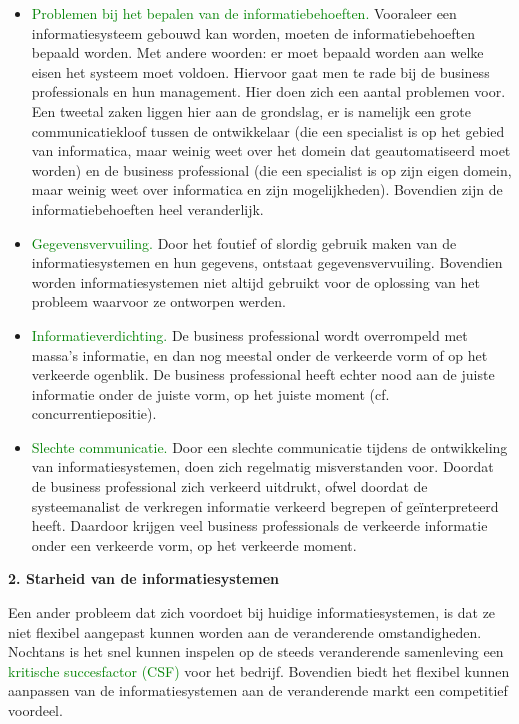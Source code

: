 \begin{itemize}
    \item \textcolor{green}{Problemen bij het bepalen van de informatiebehoeften.}
Vooraleer een informatiesysteem gebouwd kan worden, moeten de informatiebehoeften bepaald worden. Met andere woorden: er moet bepaald worden aan welke eisen het systeem moet voldoen. Hiervoor gaat men te rade bij de business professionals en hun management. Hier doen zich een aantal problemen voor. Een tweetal zaken liggen hier aan de grondslag, er is namelijk een grote communicatiekloof tussen de ontwikkelaar (die een specialist is op het gebied van informatica, maar weinig weet over het domein dat geautomatiseerd moet worden) en de business professional (die een specialist is op zijn eigen domein, maar weinig weet over informatica en zijn mogelijkheden). Bovendien zijn de informatiebehoeften heel veranderlijk.
    \item \textcolor{green}{Gegevensvervuiling.}
Door het foutief of slordig gebruik maken van de informatiesystemen en hun gegevens, ontstaat gegevensvervuiling. Bovendien worden informatiesystemen niet altijd gebruikt voor de oplossing van het probleem waarvoor ze ontworpen werden.
    \item \textcolor{green}{Informatieverdichting.}
De business professional wordt overrompeld met massa's informatie, en dan nog meestal onder de verkeerde vorm of op het verkeerde ogenblik. De business professional heeft echter nood aan de juiste informatie onder de juiste vorm, op het juiste moment (cf. concurrentiepositie).
    \item \textcolor{green}{Slechte communicatie.}
Door een slechte communicatie tijdens de ontwikkeling van informatiesystemen, doen zich regelmatig misverstanden voor. Doordat de business professional zich verkeerd uitdrukt, ofwel doordat de systeemanalist de verkregen informatie verkeerd begrepen of geïnterpreteerd heeft. Daardoor krijgen veel business professionals de verkeerde informatie onder een verkeerde vorm, op het verkeerde moment.
\end{itemize}

\textbf{2. Starheid van de informatiesystemen}

Een ander probleem dat zich voordoet bij huidige informatiesystemen, is dat ze niet flexibel aangepast kunnen worden aan de veranderende omstandigheden. Nochtans is het snel kunnen inspelen op de steeds veranderende samenleving een \textcolor{green}{kritische succesfactor (CSF)} voor het bedrijf. Bovendien biedt het flexibel kunnen aanpassen van de informatiesystemen aan de veranderende markt een competitief voordeel.

